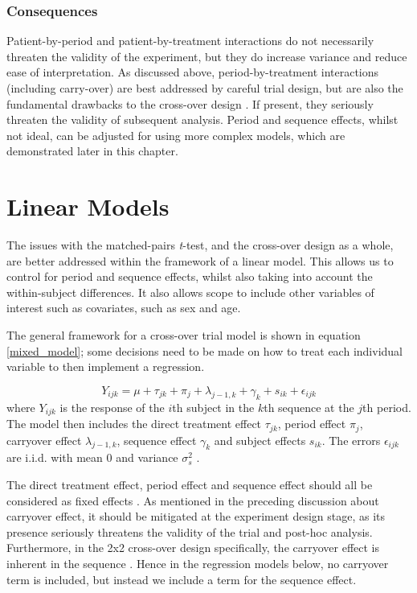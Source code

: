 \documentclass[12pt, TexShade, letterpaper]{report}
\begin{document}
\subsubsection{Consequences}
Patient-by-period and patient-by-treatment interactions do not necessarily threaten the validity of the experiment, but they do increase variance and reduce ease of interpretation. As discussed above, period-by-treatment interactions (including carry-over) are best addressed by careful trial design, but are also the fundamental drawbacks to the cross-over design \cite{senn2002crossover}. If present, they seriously threaten the validity of subsequent analysis. Period and sequence effects, whilst not ideal, can be adjusted for using more complex models, which are demonstrated later in this chapter.

\section{Linear Models}
The issues with the matched-pairs \textit{t}-test, and the cross-over design as a whole, are better addressed within the framework of a linear model. This allows us to control for period and sequence effects, whilst also taking into account the within-subject differences. It also allows scope to include other variables of interest such as covariates, such as sex and age.

The general framework for a cross-over trial model is shown in equation \ref{mixed_model}; some decisions need to be made on how to treat each individual variable to then implement a regression.

\begin{equation}
    Y_{ijk} = \mu + \tau_{jk} + \pi_j + \lambda_{j-1,k} + \gamma_k + s_{ik} + \epsilon_{ijk}
    \label{mixed_model}
\end{equation}
where $Y_{ijk}$ is the response of the $i$th subject in the $k$th sequence at the $j$th period. The model then includes the direct treatment effect $\tau_{jk}$, period effect $\pi_j$, carryover effect $\lambda_{j-1,k}$, sequence effect $\gamma_k$ and subject effects $s_{ik}$. The errors $\epsilon_{ijk}$ are i.i.d. with mean 0 and variance $\sigma^2_s$ \cite{lim2021considerations}.

The direct treatment effect, period effect and sequence effect should all be considered as fixed effects \cite{lim2021considerations}. As mentioned in the preceding discussion about carryover effect, it should be mitigated at the experiment design stage, as its presence seriously threatens the validity of the trial and post-hoc analysis. Furthermore, in the 2x2 cross-over design specifically, the carryover effect is inherent in the sequence \cite{lim2021considerations}. Hence in the regression models below, no carryover term is included, but instead we include a term for the sequence effect.
\end{document}
